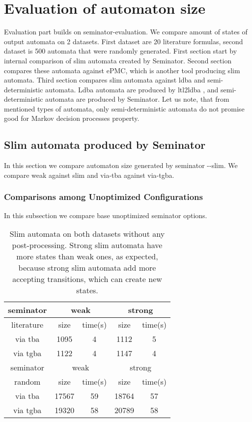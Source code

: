 \documentclass[
	digital
nolof, nolot
]{fithesis3}
\begin{document}
	\chapter{Evaluation of automaton size}
	Evaluation part builds on seminator-evaluation. We compare amount of states of output automata on 2 datasets. First dataset are 20 literature formulas, second dataset is 500 automata that were randomly generated. First section start by internal comparison of slim automata created by Seminator. Second section compares these automata against ePMC, which is another tool producing slim automata. Third section compares slim automata against ldba and semi-deterministic automata. Ldba automata are produced by ltl2ldba \cite{ltl2ldba}, and semi-deterministic automata are produced by Seminator. Let us note, that from mentioned types of automata, only semi-deterministic automata do not promise good for Markov decision processes property.
	
	\section{Slim automata produced by Seminator}
	In this section we compare automaton size generated by seminator -{}-slim.
	We compare weak against slim and via-tba against via-tgba.
	\subsection{Comparisons among Unoptimized Configurations}
	In this subsection we compare base unoptimized seminator options.
\begin{table}[ht]
	\centering
	\caption{Slim automata on both datasets without any post-processing. Strong slim automata have more states than weak ones, as expected, because strong slim automata add more accepting transitions, which can create new states. }
		\begin{tabular}{ |c||c|c|c|c| } 
			\hline
			seminator&\multicolumn{2}{c|}{weak}&\multicolumn{2}{c|}{strong} \\
			\hline
			literature&size&time(s)&size&time(s)\\
			\hhline{|=====|}
			
			via tba	&	1095	&4	& 1112 	&5\\
			\hline
			via tgba&	1122	&4		&1147	&4\\ 
			\hline
			\hline
			\hline
			seminator&\multicolumn{2}{c|}{weak}&\multicolumn{2}{c|}{strong} \\
			\hhline{|=====|}
			random&size&time(s)&size&time(s)\\
			\hline
			via tba&17567&	59& 18764 &57\\
			\hline
			via tgba&19320&	58& 20789&58\\ 
			\hline
		\end{tabular}
\end{table}
	
\end{document}

